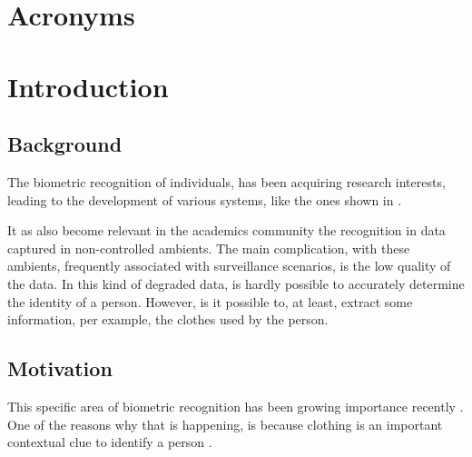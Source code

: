 \documentclass[titlepage,12pt,a4paper,times]{book}
\begin{document}
\chapter*{Acronyms}
\begin{acronym}[SIFT]
\end{acronym}

% 

\clearpage{\thispagestyle{empty}\cleardoublepage}

\mainmatter
\chapter{Introduction}
\label{chap:intro}
\nocite{*}
\section{Background}
\label{sec:amb}

The biometric recognition of individuals, has been acquiring research
interests, leading to the development of various systems, like the ones shown in
\citep{14, 15}.

It as also become relevant in the academics community the recognition in data
captured in non-controlled ambients. The main complication, with these
ambients, frequently associated with surveillance scenarios, is the low quality
of the data. In this kind of degraded data, is hardly possible to accurately
determine the identity of a person. However, is it possible to, at least,
extract some information, per example, the clothes used by the person.

\section{Motivation}
\label{sec:mot}

This specific area of biometric recognition has been growing importance
recently \citep{1, 4}. One of the reasons why that is happening, is because
clothing is an important contextual clue to identify a person \citep{2, 13}.
\end{document}
